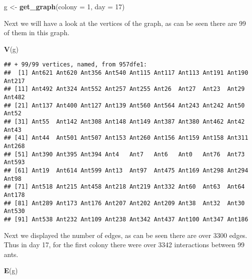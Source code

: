 \documentclass[
]{article}
\newenvironment{Shaded}{\begin{snugshade}}{\end{snugshade}}
\newcommand{\DataTypeTok}[1]{\textcolor[rgb]{0.13,0.29,0.53}{#1}}
\newcommand{\DecValTok}[1]{\textcolor[rgb]{0.00,0.00,0.81}{#1}}
\newcommand{\KeywordTok}[1]{\textcolor[rgb]{0.13,0.29,0.53}{\textbf{#1}}}
\newcommand{\NormalTok}[1]{#1}
\newcommand{\StringTok}[1]{\textcolor[rgb]{0.31,0.60,0.02}{#1}}
\begin{document}
\begin{Shaded}
\begin{Highlighting}[]
\NormalTok{g <-}\StringTok{ }\KeywordTok{get_graph}\NormalTok{(}\DataTypeTok{colony =} \DecValTok{1}\NormalTok{, }\DataTypeTok{day =} \DecValTok{17}\NormalTok{)}
\end{Highlighting}
\end{Shaded}

Next we will have a look at the vertices of the graph, as can be seen
there are 99 of them in this graph.

\begin{Shaded}
\begin{Highlighting}[]
\KeywordTok{V}\NormalTok{(g)}
\end{Highlighting}
\end{Shaded}

\begin{verbatim}
## + 99/99 vertices, named, from 957dfe1:
##  [1] Ant621 Ant620 Ant356 Ant540 Ant115 Ant117 Ant113 Ant191 Ant190 Ant217
## [11] Ant492 Ant324 Ant552 Ant257 Ant255 Ant26  Ant27  Ant23  Ant29  Ant482
## [21] Ant137 Ant400 Ant127 Ant139 Ant560 Ant564 Ant243 Ant242 Ant50  Ant52 
## [31] Ant55  Ant142 Ant308 Ant148 Ant149 Ant387 Ant380 Ant462 Ant42  Ant43 
## [41] Ant44  Ant501 Ant507 Ant153 Ant260 Ant156 Ant159 Ant158 Ant311 Ant268
## [51] Ant390 Ant395 Ant394 Ant4   Ant7   Ant6   Ant0   Ant76  Ant73  Ant593
## [61] Ant19  Ant614 Ant599 Ant13  Ant97  Ant475 Ant169 Ant298 Ant294 Ant98 
## [71] Ant518 Ant215 Ant458 Ant218 Ant219 Ant332 Ant60  Ant63  Ant64  Ant178
## [81] Ant289 Ant173 Ant176 Ant207 Ant202 Ant209 Ant38  Ant32  Ant30  Ant530
## [91] Ant538 Ant232 Ant109 Ant238 Ant342 Ant437 Ant100 Ant347 Ant186
\end{verbatim}

Next we displayed the number of edges, as can be seen there are over
3300 edges. Thus in day 17, for the first colony there were over 3342
interactions between 99 ants.

\begin{Shaded}
\begin{Highlighting}[]
\KeywordTok{E}\NormalTok{(g)}
\end{Highlighting}
\end{Shaded}
\end{document}
